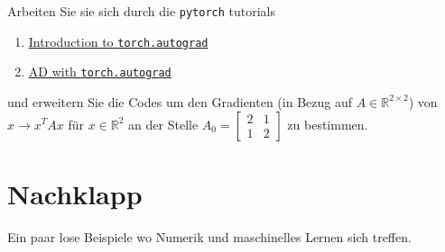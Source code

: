 \documentclass[
]{book}
\providecommand{\tightlist}{%
  \setlength{\itemsep}{0pt}\setlength{\parskip}{0pt}}
\theoremstyle{definition}
\theoremstyle{definition}
\theoremstyle{definition}
\theoremstyle{definition}
\theoremstyle{remark}
\begin{document}
Arbeiten Sie sie sich durch die \texttt{pytorch} tutorials

\begin{enumerate}
\def\labelenumi{\arabic{enumi}.}
\tightlist
\item
  \href{https://pytorch.org/tutorials/beginner/blitz/autograd_tutorial.html}{Introduction to \texttt{torch.autograd}}
\item
  \href{https://pytorch.org/tutorials/beginner/basics/autogradqs_tutorial.html}{AD with \texttt{torch.autograd}}
\end{enumerate}

und erweitern Sie die Codes um den Gradienten (in Bezug auf \(A\in \mathbb R^{2\times 2}\)) von \(x\to x^TAx\) für \(x\in \mathbb R^{2}\) an der Stelle
\(A_0=\begin{bmatrix}2 & 1 \\ 1 & 2 \end{bmatrix}\) zu bestimmen.

\hypertarget{nachklapp}{%
\chapter{Nachklapp}\label{nachklapp}}

Ein paar lose Beispiele wo Numerik und maschinelles Lernen sich treffen.
\end{document}
